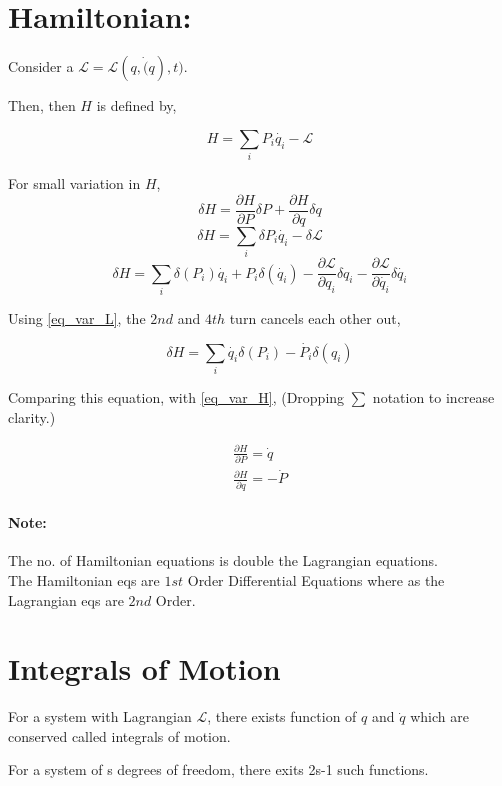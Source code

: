 \documentclass[a4paper]{article}
\newcommand{\Lagr}{\mathcal{L}}
\newcommand{\pdt}[2]{\frac{\partial #1}{\partial #2}}
\begin{document}
	\section*{Hamiltonian: }
		\noindent \hfill

		Consider a $\Lagr = \Lagr(q, \dot(q), t)$.

		Then, then $H$ is defined by, 

		\begin{equation}
			H = \sum_i P_i \dot{q_i} - \Lagr
		\end{equation}

		For small variation in $H$,
		\begin{equation}
			\delta H = \pdt{H}{P} \delta P + \pdt{H}{q}\delta q \label{eq_var_H}
		\end{equation}
		$$ \delta H = \sum_i \delta P_i\dot{q_i} - \delta \Lagr $$
		$$ \delta H = \sum_i \delta(P_i) \dot{q_i} + P_i\delta(\dot{q_i}) - \pdt{\Lagr}{q_i}\delta q_i - \pdt{\Lagr}{\dot{q_i}}\delta \dot{q_i} $$

		Using \eqref{eq_var_L}, the $2nd$ and $4th$ turn cancels each other out, 

		$$ \delta H = \sum_i \dot{q_i} \delta(P_i) - \dot{P_i} \delta(q_i) $$

		Comparing this equation, with \eqref{eq_var_H}, ({Dropping $\sum$ notation to increase clarity.})

		\begin{eqnarray}
			\pdt{H}{P} = \dot{q} \\
			\pdt{H}{q} = -\dot{P}
		\end{eqnarray}

		\paragraph*{Note:}
			The no. of Hamiltonian equations is double the Lagrangian equations. \\
			The Hamiltonian eqs are $1st$ Order Differential Equations where as the Lagrangian eqs are $2nd$ Order.
	
	\section*{Integrals of Motion}
		
		For a system with Lagrangian $\Lagr$, there exists function of $q$ and $\dot{q}$ which are conserved called integrals of motion.

		For a system of s degrees of freedom, there exits 2s-1 such functions.
\end{document}
